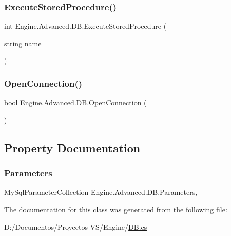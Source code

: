 \subsubsection{\texorpdfstring{ExecuteStoredProcedure()}{ExecuteStoredProcedure()}}
{\footnotesize\ttfamily int Engine.\+Advanced.\+D\+B.\+Execute\+Stored\+Procedure (\begin{DoxyParamCaption}\item[{string}]{name }\end{DoxyParamCaption})}

\mbox{\label{class_engine_1_1_advanced_1_1_d_b_abe509fe539b3198ccf2bd6a7135f630e}} 
\subsubsection{\texorpdfstring{OpenConnection()}{OpenConnection()}}
{\footnotesize\ttfamily bool Engine.\+Advanced.\+D\+B.\+Open\+Connection (\begin{DoxyParamCaption}{ }\end{DoxyParamCaption})}



\subsection{Property Documentation}
\mbox{\label{class_engine_1_1_advanced_1_1_d_b_ada97e9e083969259f1f83eec7e6ac872}} 
\subsubsection{\texorpdfstring{Parameters}{Parameters}}
{\footnotesize\ttfamily My\+Sql\+Parameter\+Collection Engine.\+Advanced.\+D\+B.\+Parameters\hspace{0.3cm}{\ttfamily [get]}, {\ttfamily [set]}}



The documentation for this class was generated from the following file\+:\begin{DoxyCompactItemize}
\item 
D\+:/\+Documentos/\+Proyectos V\+S/\+Engine/\mbox{\hyperlink{_d_b_8cs}{D\+B.\+cs}}\end{DoxyCompactItemize}

